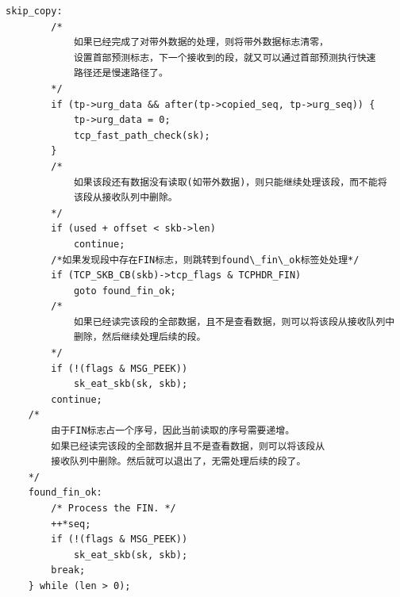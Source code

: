     
\begin{verbatim}
skip_copy:
        /*
            如果已经完成了对带外数据的处理，则将带外数据标志清零，
            设置首部预测标志，下一个接收到的段，就又可以通过首部预测执行快速
            路径还是慢速路径了。
        */
        if (tp->urg_data && after(tp->copied_seq, tp->urg_seq)) {
            tp->urg_data = 0;
            tcp_fast_path_check(sk);
        }
        /*
            如果该段还有数据没有读取(如带外数据)，则只能继续处理该段，而不能将
            该段从接收队列中删除。
        */
        if (used + offset < skb->len)
            continue;
        /*如果发现段中存在FIN标志，则跳转到found\_fin\_ok标签处处理*/
        if (TCP_SKB_CB(skb)->tcp_flags & TCPHDR_FIN)
            goto found_fin_ok;
        /*
            如果已经读完该段的全部数据，且不是查看数据，则可以将该段从接收队列中
            删除，然后继续处理后续的段。        
        */
        if (!(flags & MSG_PEEK))
            sk_eat_skb(sk, skb);
        continue;
    /*
        由于FIN标志占一个序号，因此当前读取的序号需要递增。
        如果已经读完该段的全部数据并且不是查看数据，则可以将该段从
        接收队列中删除。然后就可以退出了，无需处理后续的段了。
    */
    found_fin_ok:
        /* Process the FIN. */
        ++*seq;
        if (!(flags & MSG_PEEK))
            sk_eat_skb(sk, skb);
        break;
    } while (len > 0);
\end{verbatim}

